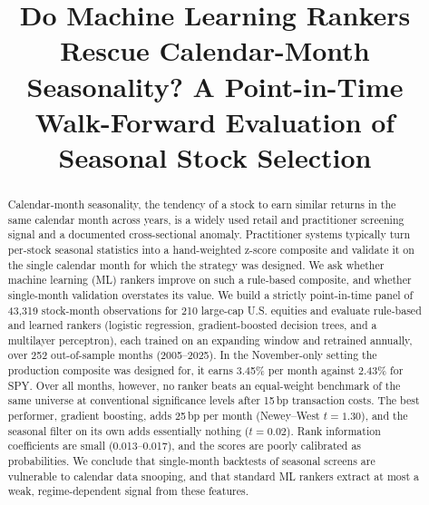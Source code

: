 \documentclass[conference]{IEEEtran}
\begin{document}
\title{Do Machine Learning Rankers Rescue Calendar-Month Seasonality? A Point-in-Time Walk-Forward Evaluation of Seasonal Stock Selection}

\author{
}

\maketitle

\begin{abstract}
Calendar-month seasonality, the tendency of a stock to earn similar returns in the same calendar month across years, is a widely used retail and practitioner screening signal and a documented cross-sectional anomaly. Practitioner systems typically turn per-stock seasonal statistics into a hand-weighted z-score composite and validate it on the single calendar month for which the strategy was designed. We ask whether machine learning (ML) rankers improve on such a rule-based composite, and whether single-month validation overstates its value. We build a strictly point-in-time panel of 43{,}319 stock-month observations for 210 large-cap U.S. equities and evaluate rule-based and learned rankers (logistic regression, gradient-boosted decision trees, and a multilayer perceptron), each trained on an expanding window and retrained annually, over 252 out-of-sample months (2005--2025). In the November-only setting the production composite was designed for, it earns 3.45\% per month against 2.43\% for SPY. Over all months, however, no ranker beats an equal-weight benchmark of the same universe at conventional significance levels after 15\,bp transaction costs. The best performer, gradient boosting, adds 25\,bp per month (Newey--West $t=1.30$), and the seasonal filter on its own adds essentially nothing ($t=0.02$). Rank information coefficients are small (0.013--0.017), and the scores are poorly calibrated as probabilities. We conclude that single-month backtests of seasonal screens are vulnerable to calendar data snooping, and that standard ML rankers extract at most a weak, regime-dependent signal from these features.
\end{abstract}
\end{document}
